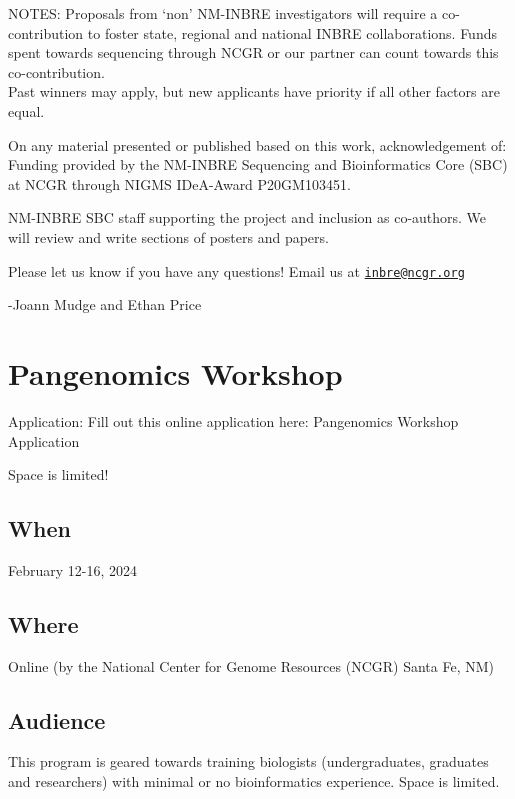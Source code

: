 \documentclass[
]{book}
\begin{document}
NOTES:
Proposals from `non' NM-INBRE investigators will require a co-contribution to foster state, regional and national INBRE collaborations. Funds spent towards sequencing through NCGR or our partner can count towards this co-contribution.\\
Past winners may apply, but new applicants have priority if all other factors are equal.

On any material presented or published based on this work, acknowledgement of:
Funding provided by the NM-INBRE Sequencing and Bioinformatics Core (SBC) at NCGR through NIGMS IDeA-Award P20GM103451.

NM-INBRE SBC staff supporting the project and inclusion as co-authors. We will review and write sections of posters and papers.

Please let us know if you have any questions! Email us at \href{mailto:inbre@ncgr.org}{\nolinkurl{inbre@ncgr.org}}

-Joann Mudge and Ethan Price

\hypertarget{pangenomics-workshop}{%
\chapter{Pangenomics Workshop}\label{pangenomics-workshop}}

Application: Fill out this online application here: Pangenomics Workshop Application

Space is limited!

\hypertarget{when}{%
\section{When}\label{when}}

February 12-16, 2024

\hypertarget{where}{%
\section{Where}\label{where}}

Online (by the National Center for Genome Resources (NCGR) Santa Fe, NM)

\hypertarget{audience}{%
\section{Audience}\label{audience}}

This program is geared towards training biologists (undergraduates, graduates and researchers) with minimal or no bioinformatics experience. Space is limited.
\end{document}
